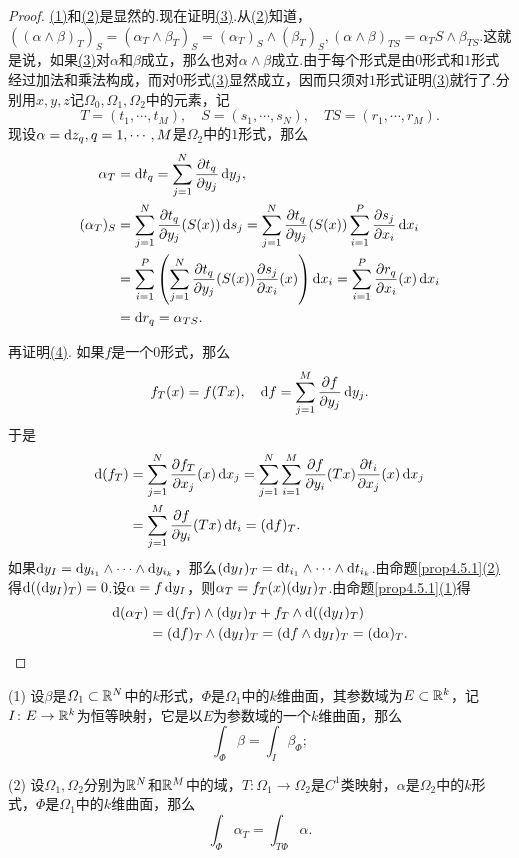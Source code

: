 \begin{proof}
	\hyperlink{4.5.2}{(1)}和\hyperlink{4.5.2}{(2)}是显然的.现在证明\hyperlink{4.5.2}{(3)}.从\hyperlink{4.5.2}{(2)}知道，$((\alpha\wedge\beta)_T)_S=(\alpha_T\wedge\beta_T)_S=(\alpha_T)_S\wedge(\beta_T)_S,(\alpha\wedge\beta)_{TS}=\alpha_TS\wedge\beta_{TS}$.这就是说，如果\hyperlink{4.5.2}{(3)}对$\alpha$和$\beta$成立，那么也对$\alpha\wedge\beta$成立.由于每个形式是由$0$形式和$1$形式经过加法和乘法构成，而对$0$形式\hyperlink{4.5.2}{(3)}显然成立，因而只须对$1$形式证明\hyperlink{4.5.2}{(3)}就行了.分别用$x,y,z$记$\Omega_0,\Omega_1,\Omega_2$中的元素，记
	\[T=(t_1,\cdots,t_M),\quad S=(s_1,\cdots,s_N),\quad TS=(r_1,\cdots,r_M).\]
	现设$\alpha=\mathop{}\!\mathrm{d} z_q,q=1,\cdots,M$是$\Omega_2$中的$1$形式，那么
	\begin{align*}
		\alpha_T
		&=\mathop{}\!\mathrm{d} t_q=\sum_{j=1}^{N}\frac{\partial t_q}{\partial y_j}\mathop{}\!\mathrm dy_j,\\
		(\alpha_T)_S
		&=\sum_{j=1}^{N}\frac{\partial t_q}{\partial y_j}(S(x))\mathop{}\!\mathrm{d} s_j=\sum_{j=1}^{N}\frac{\partial t_q}{\partial y_j}(S(x))\sum_{i=1}^{P}\frac{\partial s_j}{\partial x_i}\mathop{}\!\mathrm dx_i\\
		&=\sum_{i=1}^{P}\left(\sum_{j=1}^{N}\frac{\partial t_q}{\partial y_j}(S(x))\frac{\partial s_j}{\partial x_i}(x)\right)\mathop{}\!\mathrm dx_i=\sum_{i=1}^{P}\frac{\partial r_q}{\partial x_i}(x)\mathop{}\!\mathrm dx_i\\
		&=\mathop{}\!\mathrm{d} r_q=\alpha_{TS}.
	\end{align*}

再证明\hyperlink{4.5.2}{(4)}.
如果$f$是一个$0$形式，那么
\[f_T(x)=f(Tx),\quad \mathop{}\!\mathrm{d} f=\sum_{j=1}^{M}\frac{\partial f}{\partial y_j}\mathop{}\!\mathrm dy_j.\]
于是
\begin{align*}
	\mathop{}\!\mathrm{d}(f_T)
	&=\sum_{j=1}^{N}\frac{\partial f_T}{\partial x_j}(x)\mathop{}\!\mathrm dx_j=\sum_{j=1}^{N}\sum_{i=1}^{M}\frac{\partial f}{\partial y_i}(Tx)\frac{\partial t_i}{\partial x_j}(x)\mathop{}\!\mathrm dx_j\\
	&=\sum_{j=1}^{M}\frac{\partial f}{\partial y_i}(Tx)\mathop{}\!\mathrm{d} t_i=(\mathop{}\!\mathrm{d} f)_T.
\end{align*}
如果$\mathop{}\!\mathrm dy_I=\mathop{}\!\mathrm dy_{i_1}\wedge\cdots\wedge\mathop{}\!\mathrm dy_{i_k}$，那么$(\mathop{}\!\mathrm dy_I)_T=\mathop{}\!\mathrm{d} t_{i_1}\wedge\cdots\wedge\mathop{}\!\mathrm{d} t_{i_k}$.由命题\ref{prop4.5.1}\hyperlink{4.5.1}{(2)}得$\mathop{}\!\mathrm{d}((\mathop{}\!\mathrm dy_I)_T)=0$.设$\alpha=f\mathop{}\!\mathrm dy_I$，则$\alpha_T=f_T(x)(\mathop{}\!\mathrm dy_I)_T$.由命题\ref{prop4.5.1}\hyperlink{4.5.1}{(1)}得
\begin{align*}
	\dif(\alpha_T)
	&=\dif(f_T)\wedge(\dy_I)_T+f_T\wedge\dif((\dy_I)_T)\\
	&=(\dif f)_T\wedge(\dy_I)_T=(\dif f\wedge\dy_I)_T=(\dif\alpha)_T.\qedhere
\end{align*}
\end{proof}
\begin{prop}\label{prop4.5.3}
	(1)\hypertarget{4.5.3}{}
	设$\beta$是$\varOmega_1\subset \mathbb R^N$中的$k$形式，$\Phi$是$\Omega_1$中的$k$维曲面，其参数域为$E\subset\mathbb R^k$，记$I\colon E\to\mathbb R^k$为恒等映射，它是以$E$为参数域的一个$k$维曲面，那么
	\begin{equation}\label{eq4.5.4}
		\int_\Phi \beta=\int_I \beta_\Phi;
	\end{equation}

(2)\hypertarget{4.5.3}{}
设$\Omega_1,\Omega_2$分别为$\mathbb R^N$和$\mathbb R^M$中的域，$T\colon\Omega_1\to\Omega_2$是$C^1$类映射，$\alpha$是$\Omega_2$中的$k$形式，$\Phi$是$\Omega_1$中的$k$维曲面，那么
\begin{equation}\label{eq4.5.5}
	\int_\Phi \alpha_T=\int_{T\Phi}\alpha.
\end{equation}
\end{prop}
